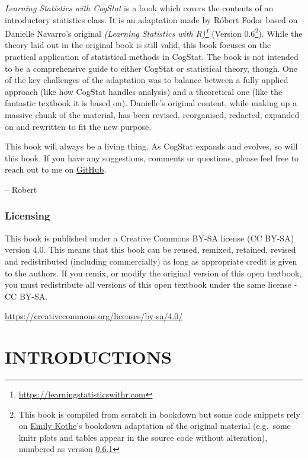 \documentclass[
]{book}
\theoremstyle{definition}
\theoremstyle{definition}
\theoremstyle{definition}
\theoremstyle{definition}
\theoremstyle{remark}
\begin{document}
\emph{Learning Statistics with CogStat} is a book which covers the contents of an introductory statistics class. It is an adaptation made by Róbert Fodor based on Danielle Navarro's original \emph{(Learning Statistics with R)\footnote{\url{https://learningstatisticswithr.com}}} (Version 0.6\footnote{This book is compiled from scratch in bookdown but some code snippets rely on \href{https://twitter.com/emilyandthelime}{Emily Kothe}'s bookdown adaptation of the original material (e.g.~some knitr plots and tables appear in the source code without alteration), numbered as version \href{https://learningstatisticswithr.com/book/}{0.6.1}}). While the theory laid out in the original book is still valid, this book focuses on the practical application of statistical methods in CogStat. The book is not intended to be a comprehensive guide to either CogStat or statistical theory, though. One of the key challenges of the adaptation was to balance between a fully applied approach (like how CogStat handles analysis) and a theoretical one (like the fantastic textbook it is based on). Danielle's original content, while making up a massive chunk of the material, has been revised, reorganised, redacted, expanded on and rewritten to fit the new purpose.

This book will always be a living thing. As CogStat expands and evolves, so will this book. If you have any suggestions, comments or questions, please feel free to reach out to me on \href{https://github.com/robertfodor/lsc/issues}{GitHub}.

-- Robert

\hypertarget{licensing}{%
\section*{Licensing}\label{licensing}}

This book is published under a Creative Commons BY-SA license (CC BY-SA) version 4.0. This means that this book can be reused, remixed, retained, revised and redistributed (including commercially) as long as appropriate credit is given to the authors. If you remix, or modify the original version of this open textbook, you must redistribute all versions of this open textbook under the same license - CC BY-SA.

\url{https://creativecommons.org/licenses/by-sa/4.0/}

\hypertarget{part-introductions}{%
\part*{INTRODUCTIONS}\label{part-introductions}}
\end{document}
